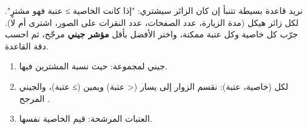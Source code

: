 \begin{statement}
نريد قاعدة بسيطة تتنبأ إن كان الزائر سيشتري: "إذا كانت الخاصية  ≥ عتبة فهو مشترٍ". لكل زائر هيكل  (مدة الزيارة، عدد الصفحات، عدد النقرات على الصور، اشترى أم لا). جرّب كل خاصية وكل عتبة ممكنة، واختر الأفضل بأقل \textbf{مؤشر جيني} مرجّح، ثم احسب دقة القاعدة.
\end{statement}
\begin{stepsbox}\begin{enumerate}
\item جيني لمجموعة:  حيث  نسبة المشترين فيها.
\item لكل (خاصية، عتبة): نقسم الزوار إلى يسار (< عتبة) ويمين (≥ عتبة)، والجيني المرجح .
\item العتبات المرشحة: قيم الخاصية نفسها.
\end{enumerate}\end{stepsbox}

